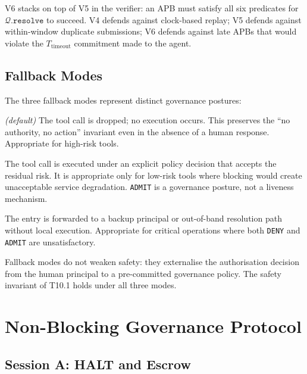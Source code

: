 \documentclass[11pt]{article}
\newcommand{\DENY}{\texttt{DENY}}
\newcommand{\ADMIT}{\texttt{ADMIT}}
\newcommand{\ESCALATE}{\texttt{ESCALATE}}
\newcommand{\Ttimeout}{T_{\mathrm{timeout}}}
\newcommand{\Queue}{\mathcal{Q}}
\begin{document}
V6 stacks on top of V5 in the verifier: an APB must satisfy all six
predicates for $\Queue.\mathtt{resolve}$ to succeed.
V4 defends against clock-based replay; V5 defends against
within-window duplicate submissions; V6 defends against late APBs
that would violate the $\Ttimeout$ commitment made to the agent.

\subsection{Fallback Modes}
\label{sec:fallback}

The three fallback modes represent distinct governance postures:

\begin{description}[itemsep=2pt]
  \item[\DENY{}] \emph{(default)} The tool call is dropped; no execution
    occurs. This preserves the ``no authority, no action'' invariant even
    in the absence of a human response. Appropriate for high-risk tools.
  \item[\ADMIT{}] The tool call is executed under an explicit policy
    decision that accepts the residual risk. It is appropriate only for
    low-risk tools where blocking would create unacceptable service
    degradation. \ADMIT{} is a governance posture, not a liveness
    mechanism.
  \item[\ESCALATE{}] The entry is forwarded to a backup principal or
    out-of-band resolution path without local execution. Appropriate for
    critical operations where both \DENY{} and \ADMIT{} are
    unsatisfactory.
\end{description}

\noindent Fallback modes do not weaken safety: they externalise the
authorisation decision from the human principal to a pre-committed
governance policy. The safety invariant of T10.1 holds under all three
modes.

\section{Non-Blocking Governance Protocol}
\label{sec:protocol}

\subsection{Session A: HALT and Escrow}
\end{document}
